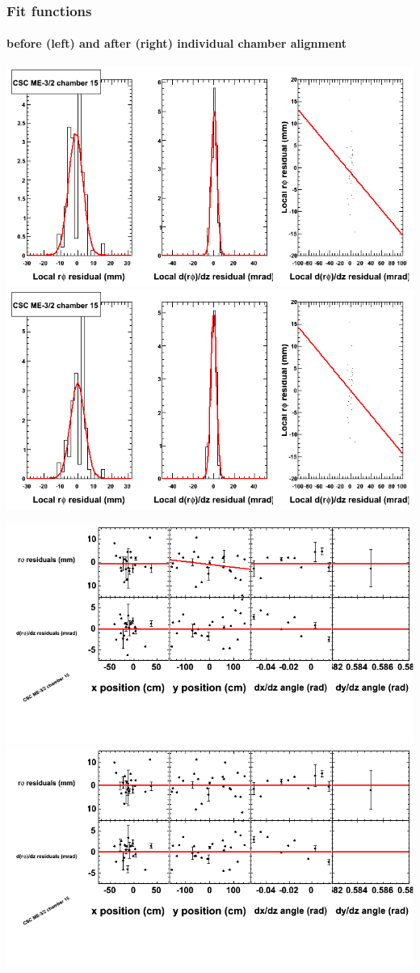 \documentclass[compress]{beamer}
\begin{document}
\begin{frame}
\frametitle{Fit functions}
\framesubtitle{before (left) and after (right) individual chamber alignment}
\includegraphics[width=0.5\linewidth]{ringfits_3dof/beforefit_MEm32_15_bellcurve.png} \includegraphics[width=0.5\linewidth]{ringfits_3dof/afterfit_MEm32_15_bellcurve.png}

\includegraphics[width=0.5\linewidth]{ringfits_3dof/beforefit_MEm32_15_polynomials.png} \includegraphics[width=0.5\linewidth]{ringfits_3dof/afterfit_MEm32_15_polynomials.png}
\end{frame}
\end{document}
